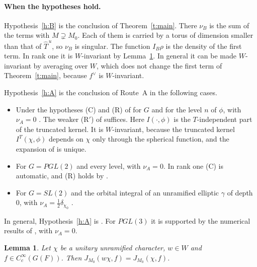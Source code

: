 \documentclass[12pt,letterpaper]{article}
\numberwithin{equation}{section}
\theoremstyle{plain}
\newtheorem{lemma}[theorem]{Lemma}
\theoremstyle{definition}
\theoremstyle{remark}
\newcommand{\Thu}{\widehat{T}^{\,u}}
\begin{document}
\paragraph{When the hypotheses hold.} Hypothesis~\ref{h:B} is the conclusion of Theorem~\ref{t:main}. There $\nu_B$ is the sum of the terms with $M\supsetneq M_0$. Each of them is carried by a torus of dimension smaller than that of $\Thu$, so $\nu_B$ is singular. The function $I_B\rho$ is the density of the first term. In rank one it is $W$-invariant by Lemma~\ref{l:Winv}. In general it can be made $W$-invariant by averaging over $W$, which does not change the first term of Theorem~\ref{t:main}, because $f^\vee$ is $W$-invariant.

Hypothesis~\ref{h:A} is the conclusion of Route~A in the following cases.
\begin{itemize}
\item Under the hypotheses (C) and (R) of \cite{JC26} for $G$ and for the level $n$ of $\phi$, with $\nu_A=0$ \cite[Thm.~4.5(b)]{JC26}. The weaker (R$'$) of \cite[Rem.~2026.20]{JC26} suffices. Here $I(\cdot,\phi)$ is the $T$-independent part of the truncated kernel. It is $W$-invariant, because the truncated kernel $I^T(\chi,\phi)$ depends on $\chi$ only through the spherical function, and the expansion of \cite[Prop.~4.2(c)]{JC26} is unique.
\item For $G=PGL(2)$ and every level, with $\nu_A=0$. In rank one (C) is automatic, and (R) holds by \cite[Lemma~6.1A]{JC26}.
\item For $G=SL(2)$ and the orbital integral of an unramified elliptic $\gamma$ of depth $0$, with $\nu_A=\frac12\delta_{\chi_0}$ \cite[Prop.~6.4]{JC26}.
\end{itemize}
In general, Hypothesis~\ref{h:A} is \cite[Conj.~4.6(a)]{JC26}. For $PGL(3)$ it is supported by the numerical results of \cite[App.~A]{JC26}, with $\nu_A=0$.

\begin{lemma}\label{l:Winv}
Let $\chi$ be a unitary unramified character, $w\in W$ and $f\in C_c^\infty(G(F))$. Then $J_{M_0}(w\chi,f)=J_{M_0}(\chi,f)$.
\end{lemma}
\end{document}
